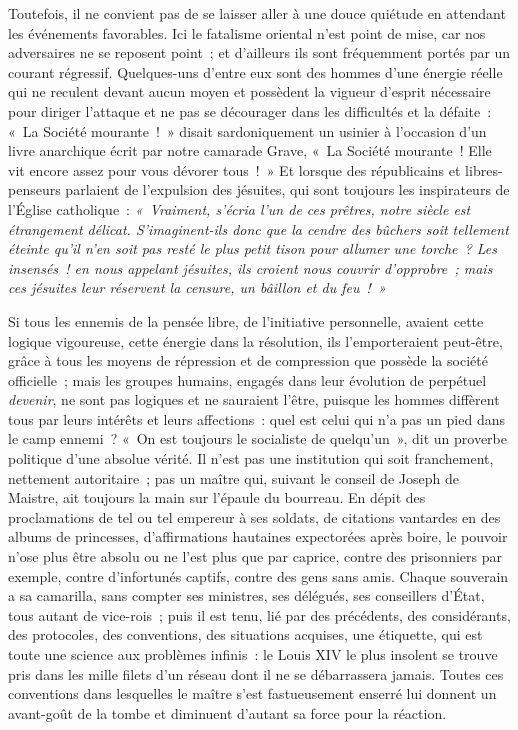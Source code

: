 \documentclass[french,twoside]{book} %
\begin{document}
Toutefois, il ne convient pas de se laisser aller à une douce quiétude en attendant les événements favorables. Ici le fatalisme oriental n’est point de mise, car nos adversaires ne se reposent point ; et d’ailleurs ils sont fréquemment portés par un courant régressif. Quelques-uns d’entre eux sont des hommes d’une énergie réelle qui ne reculent devant aucun moyen et possèdent la vigueur d’esprit nécessaire pour diriger l’attaque et ne pas se décourager dans les difficultés et la défaite : « La Société mourante ! » disait sardoniquement un usinier à l’occasion d’un livre anarchique  écrit par notre camarade Grave, « La Société mourante ! Elle vit encore assez pour vous dévorer tous ! » Et lorsque des républicains et libres-penseurs parlaient de l’expulsion des jésuites, qui sont toujours les inspirateurs de l’Église catholique : \emph{« Vraiment, s’écria l’un de ces prêtres, notre siècle est étrangement délicat. S’imaginent-ils donc que la cendre des bûchers soit tellement éteinte qu’il n’en soit pas resté le plus petit tison pour allumer une torche ? Les insensés ! en nous appelant jésuites, ils croient nous couvrir d’opprobre ; mais ces jésuites leur réservent la censure, un bâillon et du feu ! »}\par
Si tous les ennemis de la pensée libre, de l’initiative personnelle, avaient cette logique vigoureuse, cette énergie dans  la résolution, ils l’emporteraient peut-être, grâce à tous les moyens de répression et de compression que possède la société officielle ; mais les groupes humains, engagés dans leur évolution de perpétuel \emph{devenir}, ne sont pas logiques et ne sauraient l’être, puisque les hommes diffèrent tous par leurs intérêts et leurs affections : quel est celui qui n’a pas un pied dans le camp ennemi ? « On est toujours le socialiste de quelqu’un », dit un proverbe politique d’une absolue vérité. Il n’est pas une institution qui soit franchement, nettement autoritaire ; pas un maître qui, suivant le conseil de Joseph de Maistre, ait toujours la main sur l’épaule du bourreau. En dépit des proclamations de tel ou tel empereur à ses soldats, de  citations vantardes en des albums de princesses, d’affirmations hautaines expectorées après boire, le pouvoir n’ose plus être absolu ou ne l’est plus que par caprice, contre des prisonniers par exemple, contre d’infortunés captifs, contre des gens sans amis. Chaque souverain a sa camarilla, sans compter ses ministres, ses délégués, ses conseillers d’État, tous autant de vice-rois ; puis il est tenu, lié par des précédents, des considérants, des protocoles, des conventions, des situations acquises, une étiquette, qui est toute une science aux problèmes infinis : le Louis XIV le plus insolent se trouve pris dans les mille filets d’un réseau dont il ne se débarrassera jamais. Toutes ces conventions dans lesquelles le maître s’est fastueusement  enserré lui donnent un avant-goût de la tombe et diminuent d’autant sa force pour la réaction.\par
\end{document}
